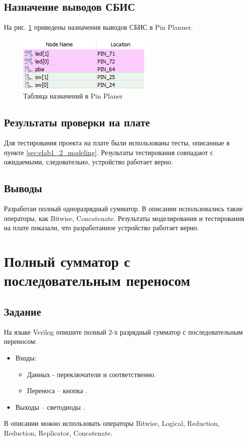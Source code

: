 \subsection{Назначение выводов СБИС}

На рис. \ref{fig:elab1_2_pins} приведены назначения выводов СБИС в Pin Planner.

\begin{figure}[H]
\begin{center}
	\includegraphics{elab1_2_pins}
	\caption{Таблица назначений в Pin Planer}
	\label{fig:elab1_2_pins}
\end{center}
\end{figure}

\subsection{Результаты проверки на плате}

Для тестирования проекта на плате были использованы тесты, описанные в пункте \ref{sec:elab1_2_modeling}. Результаты тестирования совпадают с ожидаемыми, следовательно, устройство работает верно.

\subsection{Выводы}

Разработан полный одноразрядный сумматор. В описании использовались такие операторы, как Bitwise, Concatenate. Результаты моделирования и тестирования на плате показали, что разработанное устройство работает верно.

\newpage

\section{Полный сумматор с последовательным переносом}

\subsection{Задание}

На языке Verilog опишите полный 2-х разрядный сумматор с последовательным переносом:
\begin{itemize}
	\item Входы:
	\begin{itemize}
		\item Данных - переключатели  и  соответственно.
		\item Переноса – кнопка .
	\end{itemize}
	\item Выходы – светодиоды .
\end{itemize}
В описании можно использовать операторы Bitwise, Logical, Reduction, Reduction, Replicator, Concatenate.

